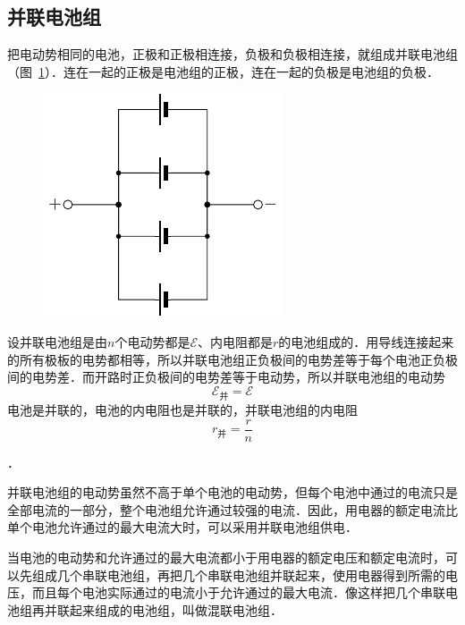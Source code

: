 \subsection{并联电池组}


把电动势相同的电池，正极和正极相连接，负极和负极相连接，就组成并联电池组（图~\ref{fig_B_7-35}）．连在一起的正极是电池组的正极，连在一起的负极是电池组的负极．
\begin{figure}[htbp]
    \centering
    \includegraphics{fig/B/7-35.pdf}
    \caption{}\label{fig_B_7-35}
\end{figure}

设并联电池组是由$n$个电动势都是$\mathcal{E}$、内电阻都是$r$的电池组成的．用导线连接起来的所有极板的电势都相等，所以并联电池组正负极间的电势差等于每个电池正负极间的电势差．而开路时正负极间的电势差等于电动势，所以并联电池组的电动势
\[\mathcal{E}_{\text{并}}=\mathcal{E} \]
电池是并联的，电池的内电阻也是并联的，并联电池组的内电阻
\[r_{\text{并}}=\frac{r}{n} \]

．

并联电池组的电动势虽然不高于单个电池的电动势，但每个电池中通过的电流只是全部电流的一部分，整个电池组允许通过较强的电流．因此，用电器的额定电流比单个电池允许通过的最大电流大时，可以采用并联电池组供电．

当电池的电动势和允许通过的最大电流都小于用电器的额定电压和额定电流时，可以先组成几个串联电池组，再把几个串联电池组并联起来，使用电器得到所需的电压，而且每个电池实际通过的电流小于允许通过的最大电流．像这样把几个串联电池组再并联起来组成的电池组，叫做混联电池组．


